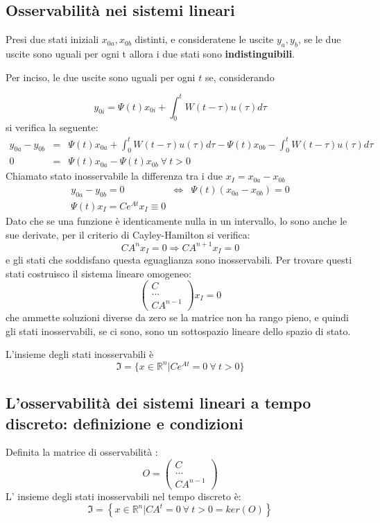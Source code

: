 \documentclass{article}
\begin{document}
\subsection{Osservabilità nei sistemi lineari}
Presi due stati iniziali $x_{0a},x_{0b}$ distinti, e consideratene le uscite $y_a,y_b$, se le due uscite 
sono uguali per ogni t allora i due stati sono \textbf{indistinguibili}.

Per inciso, le due uscite sono uguali per ogni $t$ se,
considerando 

\[ y_{0i} = \Psi(t)x_{0i} + \int_{0}^{t} W(t-\tau) u(\tau) d\tau \]
si verifica la seguente:
\[
    \begin{array}{rcl}
        y_{0a}-y_{0b} & = & \Psi(t)x_{0a} + \int_{0}^{t} W(t-\tau) u(\tau) d\tau - \Psi(t)x_{0b} - \int_{0}^{t} W(t-\tau) u(\tau) d\tau \\
        0 & = & \Psi(t)x_{0a} - \Psi(t)x_{0b} \  \forall\   t>0
    \end{array}    
\]
Chiamato stato inosservabile la differenza tra i due $x_I = x_{0a}-x_{0b}$
\[
    \begin{array}{rcl}
        y_{0a}-y_{0b}  = 0 & \Longleftrightarrow & \Psi(t)(x_{0a} -x_{0b} ) = 0  \\
        \Psi(t)x_I = C e^{At}x_I \equiv 0
    \end{array}    
\]
Dato che se una funzione è identicamente nulla in un intervallo, lo sono anche
le sue derivate, per il criterio di Cayley-Hamilton si verifica:
\[ C A^n x_I = 0 \Longrightarrow C A^{n+1} x_I = 0 \]
e gli stati che soddisfano questa eguaglianza sono inosservabili.
Per trovare questi stati costruisco il sistema lineare omogeneo:
\[\begin{pmatrix}C\\...\\CA^{n-1}\end{pmatrix}x_I = 0\]
che ammette soluzioni diverse da zero se la matrice non ha rango pieno, e quindi gli stati inosservabili,
se ci sono, sono un sottospazio lineare dello spazio di stato.

L'insieme degli stati inosservabili è 
\[\mathfrak{I} = \{ x\in\mathbb{R}^n | Ce^{At}=0\ \forall\ t > 0\}\]



\subsection{L'osservabilità dei sistemi lineari a tempo discreto: definizione e condizioni}
Definita la matrice di osservabilità :
\[O = \begin{pmatrix}C\\...\\CA^{n-1}\end{pmatrix}\]
L' insieme degli stati inosservabili nel tempo discreto è:
\[\mathfrak{I} = \left\{ x\in\mathbb{R}^n | CA^t=0\ \forall\ t > 0 = ker(O)\right\}\]
\end{document}
